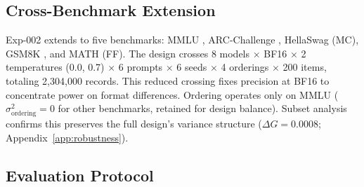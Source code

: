 \begin{table}[t]
\centering
\caption{Fully crossed G-theory design. Exp-001 evaluates MMLU across all facet levels; exp-002 extends to five benchmarks with reduced crossing. $^\dagger$BF16 balanced subset (2 temperatures: 0.0, 0.7) for cross-model analysis; the full single-model design uses all 3 levels.}
\label{tab:design_matrix}
\small
{}
\end{table}


\subsection{Cross-Benchmark Extension}
\label{sec:exp002}

Exp-002 extends to five benchmarks: MMLU \cite{hendrycks2021mmlu}, ARC-Challenge \cite{clark2018arc}, HellaSwag \cite{zellers2019hellaswag} (MC), GSM8K \cite{cobbe2021gsm8k}, and MATH \cite{hendrycks2021math} (FF). The design crosses 8 models $\times$ BF16 $\times$ 2 temperatures (0.0, 0.7) $\times$ 6 prompts $\times$ 6 seeds $\times$ 4 orderings $\times$ 200 items, totaling 2,304,000 records. This reduced crossing fixes precision at BF16 to concentrate power on format differences. Ordering operates only on MMLU ($\sigma^2_{\text{ordering}} = 0$ for other benchmarks, retained for design balance). Subset analysis confirms this preserves the full design's variance structure ($\Delta G = 0.0008$; Appendix~\ref{app:robustness}).


\subsection{Evaluation Protocol}
\label{sec:protocol}

